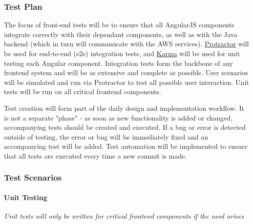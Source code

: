 \documentclass{article}
\begin{document}
		\subsubsection{Test Plan}
		The focus of front-end tests will be to ensure that all AngularJS components integrate correctly with their dependant components, as well as with the Java backend (which in turn will communicate with the AWS services). \href{http://www.protractortest.org/#/}{Protractor} will be used for end-to-end (e2e) integration tests, and \href{https://karma-runner.github.io/1.0/index.html}{Karma} will be used for unit testing each Angular component. Integration tests form the backbone of any frontend system and will be as extensive and complete as possible. User scenarios will be simulated and run via Protractor to test all possible user interaction. Unit tests will be run on all critical frontend components.
		
		Test creation will form part of the daily design and implementation workflow. It is not a separate "phase" - as soon as new functionality is added or changed, accompanying tests should be created and executed. If a bug or error is detected outside of testing, the error or bug will be immediately fixed and an accompanying test will be added. Test automation will be implemented to ensure that all tests are executed every time a new commit is made. 
			
		\subsubsection{Test Scenarios}
			\paragraph{Unit Testing}
				\textit{Unit tests will only be written for critical frontend components if the need arises}
\end{document}
